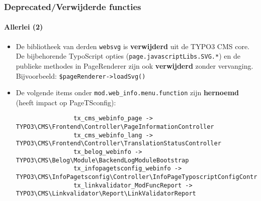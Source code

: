 
\begin{frame}[fragile]
	\frametitle{Deprecated/Verwijderde functies}
	\framesubtitle{Allerlei (2)}

	\lstset{basicstyle=\tiny\ttfamily}

	\begin{itemize}

		\item De bibliotheek van derden \texttt{websvg} is \textbf{verwijderd}
			uit de TYPO3 CMS core. De bijbehorende TypoScript opties
			(\texttt{page.javascriptLibs.SVG.*}) en de publieke methodes in
			PageRenderer zijn ook \textbf{verwijderd} zonder vervanging.\newline
			Bijvoorbeeld: \texttt{\$pageRenderer->loadSvg()}

		\item De volgende items onder \texttt{mod.web\_info.menu.function}
			zijn \textbf{hernoemd} (heeft impact op PageTSconfig):

			\begin{lstlisting}
				tx_cms_webinfo_page -> TYPO3\CMS\Frontend\Controller\PageInformationController
				tx_cms_webinfo_lang -> TYPO3\CMS\Frontend\Controller\TranslationStatusController
				tx_belog_webinfo -> TYPO3\CMS\Belog\Module\BackendLogModuleBootstrap
				tx_infopagetsconfig_webinfo -> TYPO3\CMS\InfoPagetsconfig\Controller\InfoPageTyposcriptConfigController
				tx_linkvalidator_ModFuncReport -> TYPO3\CMS\Linkvalidator\Report\LinkValidatorReport
			\end{lstlisting}

	\end{itemize}

\end{frame}


